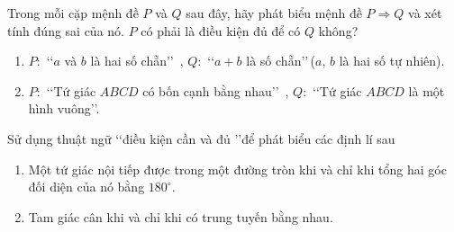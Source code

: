 \begin{bt}%
	Trong mỗi cặp  mệnh đề $P$ và $Q$ sau đây, hãy phát biểu mệnh đề $P\Rightarrow Q$ và xét tính đúng sai của nó. $P$ có phải là điều kiện đủ để có $Q$ không?
	\begin{enumerate}
		\item $P\colon$ \lq\lq$a$ và $b$ là hai số chẵn\rq\rq \,  , $Q\colon$ \lq\lq $a+b$ là số chẵn\rq\rq \,($a$, $b$ là hai số tự nhiên).
		 \item $P\colon$ \lq\lq Tứ giác $ABCD$ có bốn cạnh bằng nhau\rq\rq \, , $Q\colon$ \lq\lq Tứ giác $ABCD$ là một hình vuông\rq\rq.
	\end{enumerate}
\end{bt}

\begin{bt}%
	Sử dụng thuật ngữ \lq\lq điều kiện  cần và đủ \rq\rq để phát biểu các định lí sau
	\begin{enumerate}
		\item Một tứ giác nội tiếp được trong một đường tròn khi và chỉ khi tổng hai góc đối diện của  nó bằng $180^{\circ}$.
		\item Tam giác cân khi và chỉ khi có trung tuyến bằng  nhau.
	\end{enumerate}
\end{bt}

